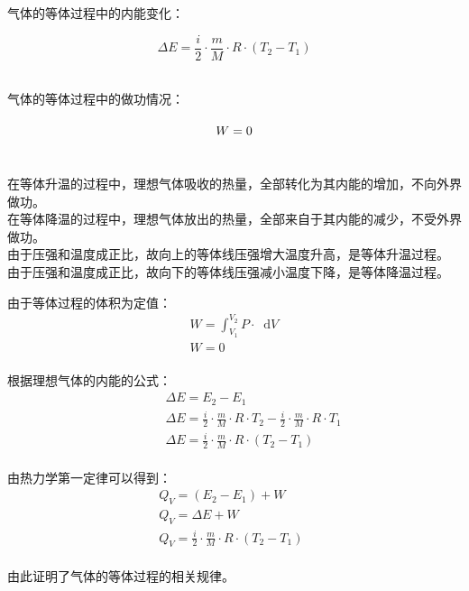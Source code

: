 \documentclass[UTF8]{ctexart}
\newcommand*{\dif}{\mathop{}\!\mathrm{d}}
\begin{document}
    气体的等体过程中的内能变化：
    \begin{large}
        \begin{equation*}
            \Delta E=\frac{i}{2}\cdot\frac{m}{M}\cdot R\cdot(T_2-T_1)
        \end{equation*}
    \end{large}\\
    气体的等体过程中的做功情况：
    \begin{large}
        \begin{equation*}
            W=0\vphantom{\frac{a}{b}}
        \end{equation*}
    \end{large}\\
    在等体升温的过程中，理想气体吸收的热量，全部转化为其内能的增加，不向外界做功。\\[3mm]
    在等体降温的过程中，理想气体放出的热量，全部来自于其内能的减少，不受外界做功。\\[3mm]
    由于压强和温度成正比，故向上的等体线压强增大温度升高，是等体升温过程。\\[3mm]
    由于压强和温度成正比，故向下的等体线压强减小温度下降，是等体降温过程。

\newpage

    由于等体过程的体积为定值：
    \begin{align}
        &W=\int_{V_1}^{V_2} P\cdot\dif V~~~~\\[4mm]
        &W=0
    \end{align}\\
    根据理想气体的内能的公式：
    \begin{align}
        &~~~~~~~~~~\Delta E=E_2-E_1\\[4mm]
        &~~~~~~~~~~\Delta E=\frac{i}{2}\cdot\frac{m}{M}\cdot R\cdot T_2-\frac{i}{2}\cdot\frac{m}{M}\cdot R\cdot T_1\\[4mm]
        &~~~~~~~~~~\Delta E=\frac{i}{2}\cdot\frac{m}{M}\cdot R\cdot (T_2-T_1)
    \end{align}\\
    由热力学第一定律可以得到：
    \begin{align}
        &Q_V=(E_2-E_1)+W\\[4mm]
        &Q_V=\Delta E+W\\[4mm]
        &Q_V=\frac{i}{2}\cdot\frac{m}{M}\cdot R\cdot (T_2-T_1)~~~~~~
    \end{align}\\
    由此证明了气体的等体过程的相关规律。

\newpage
\end{document}
